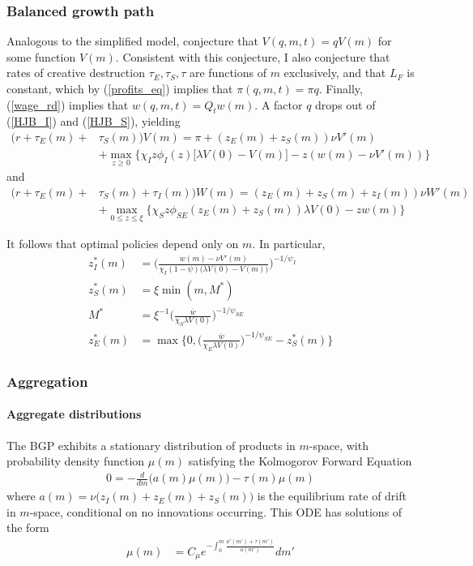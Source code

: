 \documentclass[12pt,english]{article}
\theoremstyle{remark}
\begin{document}
\subsubsection{Balanced growth path}

Analogous to the simplified model, conjecture that $V(q,m,t) = q V(m)$ for some function $V(m)$. Consistent with this conjecture, I also conjecture that rates of creative destruction $\tau_E,\tau_S,\tau$ are functions of $m$ exclusively, and that $L_F$ is constant, which by (\ref{profits_eq}) implies that $\pi(q,m,t) = \pi q$. Finally, (\ref{wage_rd}) implies that $w(q,m,t) = Q_t w(m)$. A factor $q$ drops out of (\ref{HJB_I}) and (\ref{HJB_S}), yielding
\begin{align}
(r + \tau_E(m) + &\tau_S(m)) V(m) = \pi + (z_E(m) + z_S(m))\nu V'(m) \nonumber \\
       &+ \max_{z \ge 0} \Big\{  \chi_I z \phi_I(z) \Big[\lambda V(0) - V(m) \Big] - z (w(m) - \nu V'(m)  ) \Big\} \label{BGP_HJB_I}
\end{align} 
and
\begin{align}
(r + \tau_E(m) + &\tau_S(m) + \tau_I(m))W(m) = (z_E(m) + z_S(m) + z_I(m)) \nu W'(m) \nonumber \\
		&+ \max_{0 \le z \le \xi} \Big\{  \chi_S z \phi_{SE}(z_E(m) + z_S(m)) \lambda V(0) - z w(m) \Big\} \label{BGP_HJB_S} 
\end{align}

It follows that optimal policies depend only on $m$. In particular,
\begin{align}
	z_I^*(m) &= \Bigg( \frac{w(m) - \nu V'(m)}{\chi_I (1-\psi) \Big(\lambda V(0) - V(m) \Big)} \Bigg)^{-1/\psi_I} \\
	z_S^*(m) &= \xi \min(m,M^*) \\
	M^* &= \xi^{-1}\Big(\frac{\overline{w}}{\chi_S \lambda V(0)} \Big)^{-1 / \psi_{SE}}\\
	z_E^*(m) &= \max \Bigg\{0, \Big(\frac{\overline{w}}{\chi_E \lambda V(0)} \Big)^{-1 / \psi_{SE}} - z_S^*(m)\Bigg\}
\end{align}

\subsubsection{Aggregation}\label{full_model_aggregation}

\paragraph{Aggregate distributions} The BGP exhibits a stationary distribution of products in $m$-space, with probability density function $\mu(m)$ satisfying the Kolmogorov Forward Equation
\begin{align}
	0 = - \frac{d}{dm} \Big( a(m) \mu(m) \Big) - \tau(m) \mu(m)  \label{KF_equation}
\end{align}
where $a(m) = \nu \Big( z_I(m) + z_E(m) + z_S(m)\Big)$ is the equilibrium rate of drift in $m$-space, conditional on no innovations occurring. This ODE has solutions of the form
\begin{align}
	\mu(m) &= C_\mu e^{-\int_0^m \frac{a'(m') + \tau(m')}{a(m')}} dm' \label{KF_solution_1}
\end{align}
\end{document}
